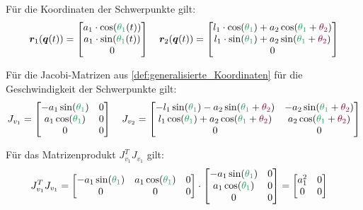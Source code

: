 \documentclass[a4paper, 12pt]{scrartcl}
\newcommand{\gruen}[2][cadGreen]{\textcolor{#1}{#2}}
\newcommand{\dunkelrot}[2][dunkelrot]{\textcolor{#1}{#2}}
\begin{document}
Für die Koordinaten der Schwerpunkte gilt:
\begin{align*}
    \bm{r}_1(\bm{q}(t))
    =
    \begin{bmatrix}
        a_1 \cdot \cos(\gruen{\theta_1}(t)) \\
        a_1 \cdot \sin(\gruen{\theta_1}(t)) \\
        0
    \end{bmatrix}
    \quad
    \bm{r}_2(\bm{q}(t))
    =
    \begin{bmatrix}
        l_1 \cdot \cos(\gruen{\theta_1}) 
        + a_2 \cos(\gruen{\theta_1} + \dunkelrot{\theta_2}) \\
        l_1 \cdot \sin(\gruen{\theta_1}) 
        + a_2 \sin(\gruen{\theta_1} + \dunkelrot{\theta_2}) \\
        0
    \end{bmatrix}
\end{align*}

Für die Jacobi-Matrizen aus \ref{def:generalisierte_Koordinaten} für die Geschwindigkeit der
Schwerpunkte gilt:
\begin{align*}
    J_{v_1} 
    =
    \begin{bmatrix}
        -a_1 \sin(\gruen{\theta_1}) & 0 \\
        a_1 \cos(\gruen{\theta_1}) & 0 \\
        0 & 0
    \end{bmatrix}
    \quad
    J_{v_2} 
    =
    \begin{bmatrix}
        -l_1 \sin(\gruen{\theta_1}) - a_2 \sin(\gruen{\theta_1} + \dunkelrot{\theta_2}) 
        & -a_2 \sin(\gruen{\theta_1} + \dunkelrot{\theta_2}) \\
        l_1 \cos(\gruen{\theta_1}) + a_2 \cos(\gruen{\theta_1} + \dunkelrot{\theta_2}) 
        & a_2 \cos(\gruen{\theta_1} + \dunkelrot{\theta_2}) \\
        0 & 0
    \end{bmatrix}
\end{align*}

Für das Matrizenprodukt $J_{v_1}^T J_{v_1}$ gilt:
\begin{align*}
    J_{v_1}^T J_{v_1} 
    &=
    \begin{bmatrix}
        -a_1 \sin(\gruen{\theta_1}) & a_1 \cos(\gruen{\theta_1}) & 0 \\
        0 & 0 & 0
    \end{bmatrix}
    \cdot
    \begin{bmatrix}
        -a_1 \sin(\gruen{\theta_1}) & 0 \\
        a_1 \cos(\gruen{\theta_1}) & 0 \\
        0 & 0
    \end{bmatrix}
    =
    \begin{bmatrix}
        a_1^2 & 0 \\
        0 & 0
    \end{bmatrix}
\end{align*}
\end{document}
